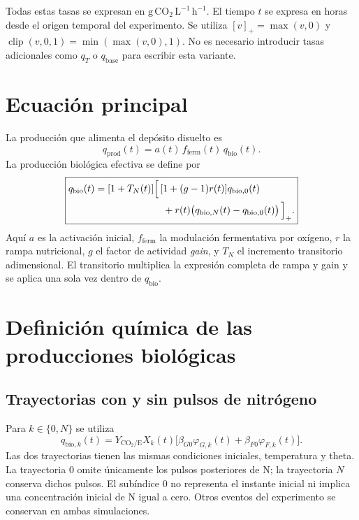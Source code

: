 \documentclass[11pt,a4paper]{article}
\newcommand{\qbio}{q_{\mathrm{bio}}}
\newcommand{\qprod}{q_{\mathrm{prod}}}
\newcommand{\fferm}{f_{\mathrm{ferm}}}
\newcommand{\clip}{\operatorname{clip}}
\begin{document}
Todas estas tasas se expresan en $\mathrm{g\,CO_2\,L^{-1}\,h^{-1}}$.
El tiempo $t$ se expresa en horas desde el origen temporal del experimento.
Se utiliza $[v]_+=\max(v,0)$ y
$\clip(v,0,1)=\min(\max(v,0),1)$. No es necesario introducir tasas adicionales
como $q_T$ o $q_{\mathrm{base}}$ para escribir esta variante.

\section{Ecuación principal}

La producción que alimenta el depósito disuelto es
\begin{equation}
\boxed{\qprod(t)=a(t)\,\fferm(t)\,\qbio(t).}
\label{eq:principal}
\end{equation}
La producción biológica efectiva se define por
\begin{equation}
\boxed{\begin{aligned}
\qbio(t)={}&[1+T_N(t)]\Bigl[\,[1+(g-1)r(t)]q_{\mathrm{bio},0}(t)\\
&\hspace{2.0cm}+r(t)\bigl(q_{\mathrm{bio},N}(t)-q_{\mathrm{bio},0}(t)\bigr)\,\Bigr]_+ .
\end{aligned}}
\label{eq:qbio}
\end{equation}
Aquí $a$ es la activación inicial, $\fferm$ la modulación fermentativa por
oxígeno, $r$ la rampa nutricional, $g$ el factor de actividad
\emph{gain}, y $T_N$ el incremento transitorio adimensional.
El transitorio multiplica la expresión completa de rampa y gain y se aplica
una sola vez dentro de $\qbio$.

\section{Definición química de las producciones biológicas}

\subsection{Trayectorias con y sin pulsos de nitrógeno}

Para $k\in\{0,N\}$ se utiliza
\begin{equation}
\boxed{q_{\mathrm{bio},k}(t)=Y_{\mathrm{CO_2/E}}X_k(t)
\bigl[\beta_{G0}\varphi_{G,k}(t)+\beta_{F0}\varphi_{F,k}(t)\bigr].}
\label{eq:raw}
\end{equation}
Las dos trayectorias tienen las mismas condiciones iniciales, temperatura y
theta. La trayectoria $0$ omite únicamente los pulsos posteriores de N; la
trayectoria $N$ conserva dichos pulsos. El subíndice $0$ no representa el
instante inicial ni implica una concentración inicial de N igual a cero.
Otros eventos del experimento se conservan en ambas simulaciones.
\end{document}
